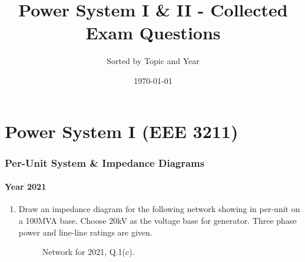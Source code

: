\documentclass[12pt, a4paper]{article}
\title{Power System I \& II - Collected Exam Questions}
\author{Sorted by Topic and Year}
\date{\today}
\begin{document}
	\maketitle
	\tableofcontents
	\newpage
	
	\part{Power System I (EEE 3211)}
	
	\section{Per-Unit System \& Impedance Diagrams}
	\subsection{Year 2021}
	\begin{enumerate}[label=\textbf{Q1(c).}, wide, labelindent=0pt]
		\item Draw an impedance diagram for the following network showing in per-unit on a 100MVA base. Choose 20kV as the voltage base for generator. Three phase power and line-line ratings are given.
		\begin{figure}[h!]
			\centering
			\caption{Network for 2021, Q.1(c).}
		\end{figure}
	\end{enumerate}
	
\end{document}
